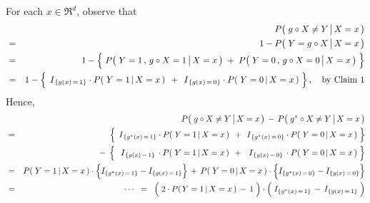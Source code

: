 \vskip 0.5cm
\noindent
For each $x \in \Re^{d}$, observe that
\begin{eqnarray*}
&&
	P\!\left(\,\left. \overset{{\color{white}.}}{g} \circ X \neq Y \,\right\vert X = x \,\right)
\\
&=&
	1 - P\!\left(\,\left. Y = \overset{{\color{white}.}}{g} \circ X \,\right\vert X = x \,\right)
\\
&=&
	1 - \left\{\;
		\overset{{\color{white}.}}{P}\!\left(\,\left. Y = 1 \,,\, \overset{{\color{white}.}}{g} \circ X = 1 \,\right\vert X = x \,\right)
		\; + \;
		P\!\left(\,\left. Y = 0 \,,\, \overset{{\color{white}.}}{g} \circ X = 0 \,\right\vert X = x \,\right)
		\;\right\}
\\
&=&
	1 - \left\{\;
		\,\overset{{\color{white}.}}{I}_{\{g(x)\,=\,1\}} \cdot P\!\left(\,\left. Y = 1 \,\right\vert X = x \,\right)\,
		\; + \;
		\,\overset{{\color{white}.}}{I}_{\{g(x)\,=\,0\}} \cdot P\!\left(\,\left. Y = 0 \,\right\vert X = x \,\right)
		\;\right\},
	\quad
	\textnormal{by Claim 1}
\end{eqnarray*}
Hence,
\begin{eqnarray*}
&&
	P\!\left(\,\left. g \overset{{\color{white}.}}{\circ} X \neq Y \,\right\vert X = x \,\right)
	\, - \,
	P\!\left(\,\left. g^{*} \overset{{\color{white}.}}{\circ} X \neq Y \,\right\vert X = x \,\right)
\\
&=&
	{\color{white}- \;}
	\left\{\;
		\,\overset{{\color{white}.}}{I}_{\{g^{*}(x)\,=\,1\}} \cdot P\!\left(\,\left. Y = 1 \,\right\vert X = x \,\right)\,
		\; + \;
		\,\overset{{\color{white}.}}{I}_{\{g^{*}(x)\,=\,0\}} \cdot P\!\left(\,\left. Y = 0 \,\right\vert X = x \,\right)
		\;\right\}
\\
&&
	- \;
	\left\{\;
		\,\;\overset{{\color{white}.}}{I}_{\{g(x)\,=\,1\}}\, \cdot P\!\left(\,\left. Y = 1 \,\right\vert X = x \,\right)\,
		\; + \;
		\,\;\overset{{\color{white}.}}{I}_{\{g(x)\,=\,0\}}\, \cdot P\!\left(\,\left. Y = 0 \,\right\vert X = x \,\right)
		\;\right\}
\\
&=&
	P\!\left(\,\left. Y = 1 \,\right\vert X = x \,\right) \cdot \left\{ I_{\{g^{*}(x)\,=\,1\}} \overset{{\color{white}.}}{-} I_{\{g(x)\,=\,1\}} \right\}
	\,+\,
	P\!\left(\,\left. Y = 0 \,\right\vert X = x \,\right) \cdot \left\{ I_{\{g^{*}(x)\,=\,0\}} \overset{{\color{white}.}}{-} I_{\{g(x)\,=\,0\}} \right\}
\\
&=&
	\cdots
	\;\; = \;\;
	\left(\; 2 \cdot P\!\left(\left.Y=1\,\right\vert X =x \,\right) \,\overset{{\color{white}.}}{-}\, 1 \;\right)
	\cdot
	\left(\; I_{\{g^{*}(x)\,=\,1\}} \,\overset{{\color{white}.}}{-}\, I_{\{g(x)\,=\,1\}} \;\right)
\end{eqnarray*}
